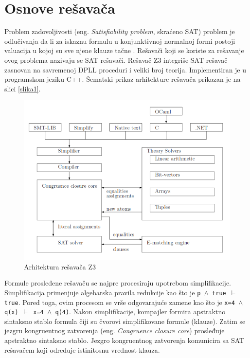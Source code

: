 \documentclass[12pt,oneside]{memoir}
\begin{document}
\section{Osnove rešavača}  \label{sec:num1}
Problem zadovoljivosti (eng. \textit{Satisfiability problem}, skraćeno SAT) problem je odlučivanja da li za iskaznu formulu u konjunktivnoj normalnoj formi postoji valuacija u kojoj su sve njene 
klauze tačne \cite{Handbook}. 
Rešavači koji se koriste za rešavanje ovog problema nazivaju se SAT rešavači.   
Rešavač Z3 integriše SAT rešavač zasnovan na savremenoj DPLL proceduri i veliki broj teorija. 
Implementiran je u programskom jeziku C++. Šematski prikaz arhitekture \cite{EfficientSMTSolver} rešavača prikazan je na slici \ref{slika1}. 
\begin{figure}[!ht]\label{slika1}
  \centering
  \includegraphics[width=1\textwidth]{arhitektura.png}
  \caption{Arhitektura rešavača Z3}
  \label{fig:arhitektura}
\end{figure}
\par
Formule prosleđene rešavaču se najpre procesiraju upotrebom simplifikacije. Simplifikacija primenjuje algebarska pravila redukcije kao što je \texttt{p $\land$ true $\vdash$ true}. Pored toga, ovim procesom se vrše odgovarajuće zamene kao što je \texttt{x=4 $\land$ q(x) $\vdash$ x=4 $\land$ q(4)}.
Nakon simplifikacije, kompajler formira apstraktno sintaksno stablo formula čiji su čvorovi simplifikovane formule (klauze). Zatim se jezgru kongruentnog zatvorenja (eng. 
\textit{Congruence closure core}) prosleđuje apstraktno sintaksno stablo. Jezgro kongruentnog zatvorenja komunicira sa SAT rešavačem koji određuje istinitosnu vrednost klauza. 
\end{document}
